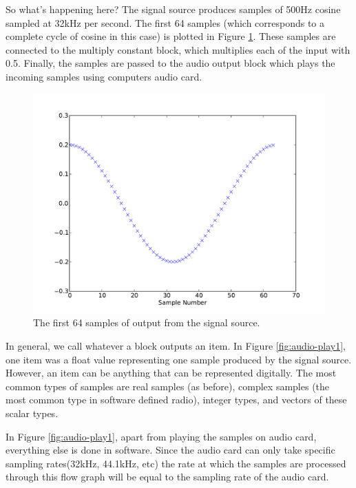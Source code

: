\documentclass[a4paper,10pt]{report}
\begin{document}
So what's happening here?
The signal source produces samples of 500Hz cosine sampled at 32kHz per second.
The first 64 samples (which corresponds to a complete cycle of cosine in this case)
is plotted in Figure \ref{fig:signal-source-out}.
These samples are connected to the multiply constant block,
which multiplies each of the input with 0.5.
Finally, the samples are passed to the audio output block which plays the incoming samples using computers audio card.
\begin{figure}
 \centering
 \includegraphics[scale=0.4]{figures/signal-source-out}
 \caption{The first 64 samples of output from the signal source. \label{fig:signal-source-out}}
\end{figure}

In general, we call whatever a block outputs an item. 
In Figure \ref{fig:audio-play1}, one item was a float value representing one sample produced by the signal source. 
However, an item can be anything that can be represented digitally. 
The most common types of samples are real samples (as before), complex samples (the most common type in software defined radio), integer types, and vectors of these scalar types.

In Figure \ref{fig:audio-play1}, apart from playing the samples on audio card, everything else is done in software.
Since the audio card can only take specific sampling rates(32kHz, 44.1kHz, etc)
the rate at which the samples are processed through this flow graph will be equal to the sampling rate of the audio card.
\end{document}
